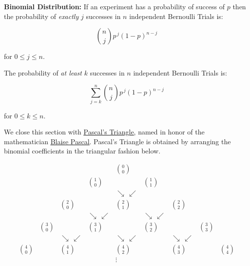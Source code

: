 \documentclass{ximera}
\begin{document}

\begin{theorem}  \label{BinomialDistribution}  \textbf{Binomial Distribution:}  If an experiment has a probability of success of $p$ then the probability of \textit{exactly} $j$ successes in $n$ independent Bernoulli Trials is:

\[ \displaystyle{\binom{n}{j} p^{\, j} (1-p)^{n-j}} \]

for $0 \leq j \leq n$.

The probability of \textit{at least} $k$ successes in $n$ independent Bernoulli Trials is:

\[ \displaystyle{ \sum_{j=k}^{n} \binom{n}{j} p^{\, j} (1-p)^{n-j}} \]

for $0 \leq k \leq n$.

\end{theorem}



 

We close this section with  \href{http://en.wikipedia.org/wiki/Pascal's_triangle}{\underline{Pascal's Triangle}}, named in honor of the mathematician \href{http://en.wikipedia.org/wiki/Blaise_Pascal}{\underline{Blaise Pascal}}.  Pascal's Triangle is obtained by arranging the binomial coefficients in the triangular fashion below.

\[\begin{array}{ccccccccc} 
&	&	&	&	\displaystyle{\binom{0}{0}}	&	&	&	&	\\  
&	&	&	\displaystyle{\binom{1}{0}}	&	&	\displaystyle{\binom{1}{1}}	&	&	&\\  
&	&	&	&	\searrow \, \swarrow &	&	&	&	\\  
&	&	\displaystyle{\binom{2}{0}}	&	&	\displaystyle{\binom{2}{1}}	&	&	\displaystyle{\binom{2}{2}}	&	&\\  
&                             &  & 	\searrow \, \swarrow      & & 	\searrow \, \swarrow      & &                             & \\  
&	\displaystyle{\binom{3}{0}}	&	&	\displaystyle{\binom{3}{1}}	&	&	\displaystyle{\binom{3}{2}}	&	&	\displaystyle{\binom{3}{3}}	&	\\  
                            &	&	\searrow \, \swarrow 	&	&	\searrow \, \swarrow 	&	&	\searrow \, \swarrow 	&	& \\  
\displaystyle{\binom{4}{0}}	&	&	\displaystyle{\binom{4}{1}}	&	&	\displaystyle{\binom{4}{2}}	&	&	\displaystyle{\binom{4}{3}}	&	&	\displaystyle{\binom{4}{4}} \\  
 	&	&	 	&	&	\vdots	&	&	 	&	&	  \\
\end{array} \]
\end{document}
